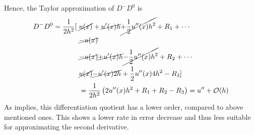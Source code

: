 Hence, the Taylor approximation of $D^-D^0$ is
\begin{align}
	\nonumber
	D^-D^0 = \frac{1}{2h^2}[\;&\cancel{u(x)} + \cancel{u^{\prime}(x) h} \cancel{+ \frac{1}{2} u^{\prime\prime}(x)h^2} + R_1 + \cdots \\
	\nonumber
					          &\cancel{-u(x)} \\
	\nonumber
							  &\cancel{-u(x)} \cancel{+ u^{\prime}(x) h} \cancel{- \frac{1}{2} u^{\prime\prime}(x)h^2} + R_2 + \cdots \\
	\nonumber
							  &\cancel{u(x)} \cancel{- u^{\prime}(x)2h} + \frac{1}{2} u^{\prime\prime}(x)4h^2 - R_3 ]\\
							  \label{eq:D-0}
							  & = \frac{1}{2h^2}\left(2u^{\prime\prime}(x)h^2 +R_1 +R_2 - R_3\right) = u^{\prime\prime} + \mathcal{O}(h)
\end{align}
As  implies, this differentiation quotient has a lower order, compared to above mentioned ones.
This shows a lower rate in error decrease and thus less suitable for approximating the second derivative.